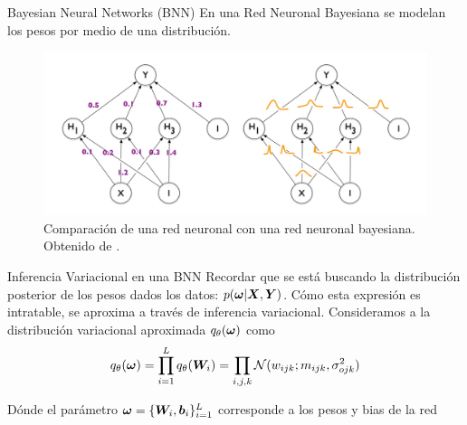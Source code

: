 \begin{frame}{Bayesian Neural Networks (BNN)}
    En una Red Neuronal Bayesiana se modelan los pesos por medio de una distribución. 
    \begin{figure}[H]
        \centering
        \includegraphics[width=\linewidth]{presentaciones/img/comp_NN_con_BNN.jpg}
        \caption{Comparación de una red neuronal con una red neuronal bayesiana. Obtenido de \cite{blundell2015weight}.}
        \label{fig:comp_NN_con_BNN}
    \end{figure}
\end{frame}

\begin{frame}{Inferencia Variacional en una BNN}
    Recordar que se está buscando la distribución posterior de los pesos dados los datos: $p({\bm{\omega}} | {\bm{X}}, {\bm{Y}})$. Cómo esta expresión es intratable, se aproxima a través de inferencia variacional. Consideramos a la distribución variacional aproximada $q_\theta({\bm{\omega}})$ como
    \begin{equation}
        q_\theta({\bm{\omega}}) = \prod_{i=1}^{L} q_\theta ({\bm{W}}_i) = \prod_{i, j, k} \mathcal{N}(w_{ijk}; m_{ijk}, \sigma^2_{ojk})
    \end{equation}
    
    Dónde el parámetro ${\bm{\omega}} = \{{\bm{W}}_i, {\bm{b}}_i\}_{i=1}^{L}$ corresponde a los pesos y bias de la red
\end{frame}

